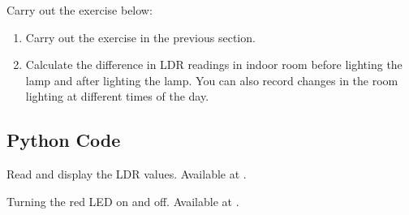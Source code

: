 \begin{exercise}
  Carry out the exercise below:
  \begin{enumerate}
    \item Carry out the exercise in the previous section.
    \item Calculate the difference in LDR readings in indoor room
          before lighting the lamp and after lighting the lamp. You can also
          record changes in the room lighting at different times of the day.
  \end{enumerate}
\end{exercise}

\subsection{Python Code}
\label{sec:ldr-python-code}

\begin{pycode}
  {Read and display the LDR values.  Available at
    .}
  \label{py:ldr-read}
  
\end{pycode}

\begin{pycode}
  {Turning the red LED on and off.  Available at
    .}
  \label{py:ldr-led}
  
\end{pycode}

